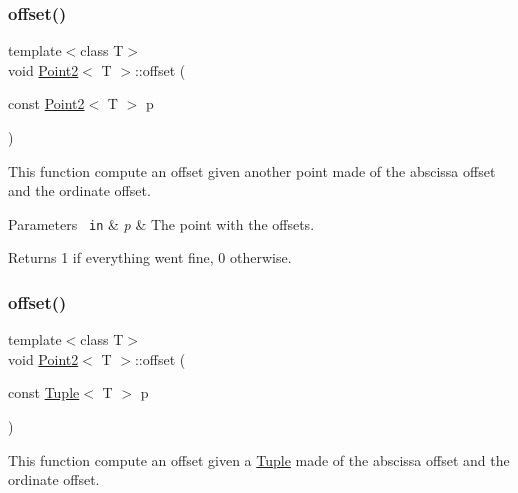 \subsubsection{\texorpdfstring{offset()}{offset()}\hspace{0.1cm}{\footnotesize\ttfamily [2/3]}}
{\footnotesize\ttfamily template$<$class T$>$ \\
void \mbox{\hyperlink{class_point2}{Point2}}$<$ T $>$\+::offset (\begin{DoxyParamCaption}\item[{const \mbox{\hyperlink{class_point2}{Point2}}$<$ T $>$}]{p }\end{DoxyParamCaption})\hspace{0.3cm}{\ttfamily [inline]}}



This function compute an offset given another point made of the abscissa offset and the ordinate offset. 


\begin{DoxyParams}[1]{Parameters}
\mbox{\texttt{ in}}  & {\em p} & The point with the offsets. \\
\hline
\end{DoxyParams}
\begin{DoxyReturn}{Returns}
1 if everything went fine, 0 otherwise. 
\end{DoxyReturn}
\mbox{\label{class_point2_aaa05b71e25db64c365fe2377d4f3f812}} 
\subsubsection{\texorpdfstring{offset()}{offset()}\hspace{0.1cm}{\footnotesize\ttfamily [3/3]}}
{\footnotesize\ttfamily template$<$class T$>$ \\
void \mbox{\hyperlink{class_point2}{Point2}}$<$ T $>$\+::offset (\begin{DoxyParamCaption}\item[{const \mbox{\hyperlink{class_tuple}{Tuple}}$<$ T $>$}]{p }\end{DoxyParamCaption})\hspace{0.3cm}{\ttfamily [inline]}}



This function compute an offset given a {\ttfamily \mbox{\hyperlink{class_tuple}{Tuple}}} made of the abscissa offset and the ordinate offset. 


